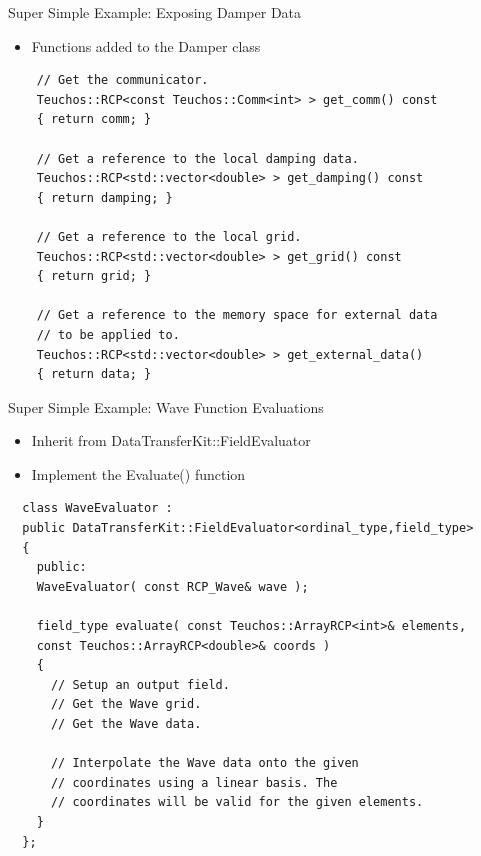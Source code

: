 \documentclass{beamer}
\begin{document}
\begin{frame}[fragile]{Super Simple Example: Exposing Damper Data}

  \begin{itemize}
  \item Functions added to the Damper class
  \end{itemize}

  \begin{lstlisting}
    // Get the communicator.
    Teuchos::RCP<const Teuchos::Comm<int> > get_comm() const
    { return comm; }

    // Get a reference to the local damping data.
    Teuchos::RCP<std::vector<double> > get_damping() const
    { return damping; }

    // Get a reference to the local grid.
    Teuchos::RCP<std::vector<double> > get_grid() const
    { return grid; }

    // Get a reference to the memory space for external data 
    // to be applied to.
    Teuchos::RCP<std::vector<double> > get_external_data()
    { return data; }
  \end{lstlisting}

\end{frame}

\begin{frame}[fragile]{Super Simple Example: Wave Function Evaluations}

  \begin{itemize}
  \item Inherit from DataTransferKit::FieldEvaluator
  \item Implement the Evaluate() function
  \end{itemize}
 
  \begin{lstlisting}
  class WaveEvaluator : 
  public DataTransferKit::FieldEvaluator<ordinal_type,field_type>
  {
    public:
    WaveEvaluator( const RCP_Wave& wave );

    field_type evaluate( const Teuchos::ArrayRCP<int>& elements,
    const Teuchos::ArrayRCP<double>& coords )
    {
      // Setup an output field.
      // Get the Wave grid.
      // Get the Wave data.

      // Interpolate the Wave data onto the given 
      // coordinates using a linear basis. The 
      // coordinates will be valid for the given elements.
    }
  };
  \end{lstlisting}

\end{frame}
\end{document}
